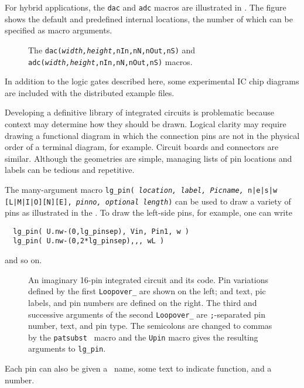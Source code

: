 \pagebreak
For hybrid applications, the \verb|dac| and \verb|adc| macros are
illustrated in .
The figure shows the default and predefined internal locations, the number
of which can be specified as macro arguments.
\begin{figure}[ht]
   
   \caption{The {\tt dac({\sl width,height},nIn,nN,nOut,nS)}
   and {\tt adc({\sl width,height},nIn,nN,nOut,nS)} macros.}
   \label{Dac}
   \end{figure}

In addition to the logic gates described here, some experimental
IC chip diagrams are included with the distributed example files.

Developing a definitive library of integrated circuits is problematic
because context may determine how they should be drawn.  Logical clarity
may require drawing a functional diagram in which the connection pins are
not in the physical order of a terminal diagram, for example.  Circuit
boards and connectors are similar. Although the geometries are simple,
managing lists of pin locations and labels can be tedious and repetitive.

The many-argument macro
 {\tt lg\_pin( {\sl location, label, Picname,} n|e|s|w [L|M|I|O][N][E],
  {\sl pinno, optional length})}
can be used to draw a variety of pins as illustrated in the .
To draw the left-side pins, for example, one can write
\begin{verbatim}
  lg_pin( U.nw-(0,lg_pinsep), Vin, Pin1, w )
  lg_pin( U.nw-(0,2*lg_pinsep),,, wL )
\end{verbatim}
\noindent
and so on.
\begin{figure}[h!]
   \parbox{\textwidth}{\small}%
   \hfill\llap{\raise-0.15in\hbox{ }}%
   \vspace*{-\baselineskip}%
   \caption{ An imaginary 16-pin integrated circuit and its code.
    Pin variations defined by the first {\tt Loopover\_}
    are shown on the left; and text, pic labels, and pin
    numbers are defined on the right.
    The third and successive arguments of the second
    {\tt Loopover\_}
    are {\tt ;}-separated pin number, text, and pin type. The
    semicolons are changed to commas by the {\tt patsubst} \Mfour\ macro
    and the {\tt Upin} macro gives the resulting arguments to {\tt lg\_pin}.
\label{sampleIC}}%
   \end{figure}
Each pin can also be given a \pic\ name, some text
to indicate function, and a number.

